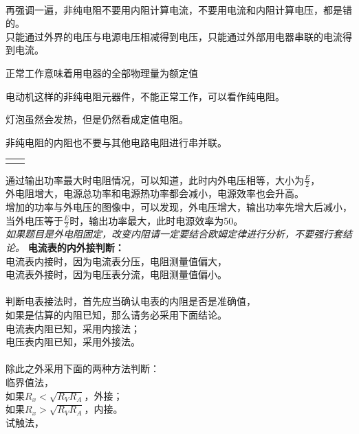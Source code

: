 \documentclass[a4paper, landscape, 10pt, twocolumn]{article}
\begin{document}
\\
再强调一遍，非纯电阻不要用内阻计算电流，不要用电流和内阻计算电压，都是错的。\\
只能通过外界的电压与电源电压相减得到电压，只能通过外部用电器串联的电流得到电流。\\
\begin{compactitem}
  \item 正常工作意味着用电器的全部物理量为额定值
  \item 电动机这样的非纯电阻元器件，不能正常工作，可以看作纯电阻。
  \item 灯泡虽然会发热，但是仍然看成定值电阻。
  \item 非纯电阻的内阻也不要与其他电路电阻进行串并联。
\end{compactitem}
\begin{tabularx}{\columnwidth}{XX}
  \rowcolor{blue!30}
  \multicolumn{2}{l}{\parbox[c][2.5\ht\strutbox][c]{0.9\columnwidth}{\Large 电路实验}} \\
\end{tabularx}
通过输出功率最大时电阻情况，可以知道，此时内外电压相等，大小为$\frac E2$，\\
外电阻增大，电源总功率和电源热功率都会减小，电源效率也会升高。\\
增加的功率与外电压的图像中，可以发现，外电压增大，输出功率先增大后减小，\\
当外电压等于$\frac E2$时，输出功率最大，此时电源效率为50\percent 。\\
\textit{如果题目是外电阻固定，改变内阻请一定要结合欧姆定律进行分析，不要强行套结论。}
\noindent \textbf{电流表的内外接判断：}\\
电流表内接时，因为电流表分压，电阻测量值偏大，\\
电流表外接时，因为电压表分流，电阻测量值偏小。\\
\\
判断电表接法时，首先应当确认电表的内阻是否是准确值，\\
如果是估算的内阻已知，那么请务必采用下面结论。\\
电流表内阻已知，采用内接法；\\
电压表内阻已知，采用外接法。\\
\\
除此之外采用下面的两种方法判断：\\
临界值法，\\
如果$R_x<\sqrt{R_VR_A}$，外接；\\
如果$R_x>\sqrt{R_VR_A}$，内接。\\
试触法，\\
\end{document}
